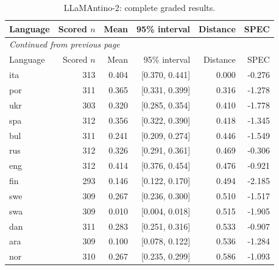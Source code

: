 \endgroup

\begingroup\footnotesize\setlength{\tabcolsep}{3pt}\renewcommand{\arraystretch}{1.12}

\begin{longtable}{lrrrrr}

\caption{LLaMAntino-2: complete graded results.}\label{tab:detail-llamantino_2_ultrachat_7b}\\

\toprule

Language & Scored $n$ & Mean & 95\% interval & Distance & SPEC\\\midrule

\endfirsthead

\multicolumn{6}{l}{\textit{Continued from previous page}}\\

\toprule

Language & Scored $n$ & Mean & 95\% interval & Distance & SPEC\\\midrule

\endhead

\bottomrule\endfoot

ita & 313 & 0.404 & [0.370, 0.441] & 0.000 & -0.276\\

por & 311 & 0.365 & [0.331, 0.399] & 0.316 & -1.278\\

ukr & 303 & 0.320 & [0.285, 0.354] & 0.410 & -1.778\\

spa & 312 & 0.356 & [0.322, 0.390] & 0.418 & -1.345\\

bul & 311 & 0.241 & [0.209, 0.274] & 0.446 & -1.549\\

rus & 312 & 0.326 & [0.291, 0.361] & 0.469 & -0.306\\

eng & 312 & 0.414 & [0.376, 0.454] & 0.476 & -0.921\\

fin & 293 & 0.146 & [0.122, 0.170] & 0.494 & -2.185\\

swe & 309 & 0.267 & [0.236, 0.300] & 0.510 & -1.517\\

swa & 309 & 0.010 & [0.004, 0.018] & 0.515 & -1.905\\

dan & 311 & 0.283 & [0.251, 0.316] & 0.533 & -0.907\\

ara & 309 & 0.100 & [0.078, 0.122] & 0.536 & -1.284\\

nor & 310 & 0.267 & [0.235, 0.299] & 0.586 & -1.093\\

\end{longtable}

